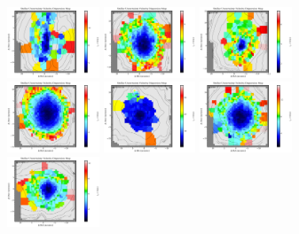 \begin{figure}
      \centering
      \includegraphics[width=0.245\textwidth]{Vmaps/ngc0612_stellar_sigma_uncert.png}
      \includegraphics[width=0.245\textwidth]{Vmaps/ngc3557_stellar_sigma_uncert.png}
      \includegraphics[width=0.245\textwidth]{Vmaps/ngc3100_stellar_sigma_uncert.png}
      \includegraphics[width=0.245\textwidth]{Vmaps/ic1459_stellar_sigma_uncert.png}
      \includegraphics[width=0.245\textwidth]{Vmaps/pks0718-34_stellar_sigma_uncert.png}
      \includegraphics[width=0.245\textwidth]{Vmaps/ic4296_stellar_sigma_uncert.png}
      \includegraphics[width=0.245\textwidth]{Vmaps/ngc7075_stellar_sigma_uncert.png}

\end{figure}
